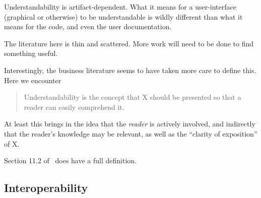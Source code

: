 \documentclass[letterpaper,cleveref]{lipics-v2019}
\theoremstyle{definition}
\begin{document}
Understandability is artifact-dependent. What it means for a user-interface (graphical
or otherwise) to be understandable is wildly different than what it means for the code,
and even the user documentation.

The literature here is thin and scattered.  More work will need to be done to find
something useful.

Interestingly, the business literature seems to have taken more care to define this.
Here we encounter
\begin{quote}
Understandability is the concept that X should be presented
so that a reader can easily comprehend it.
\end{quote}
At least this brings in the idea that the \emph{reader} is actively involved, and
indirectly that the reader's knowledge may be relevant, as well as the
``clarity of exposition'' of X.

Section 11.2 of~\cite{adams2015nonfunctional} does have a full definition.

\subsection{Interoperability}
\end{document}

